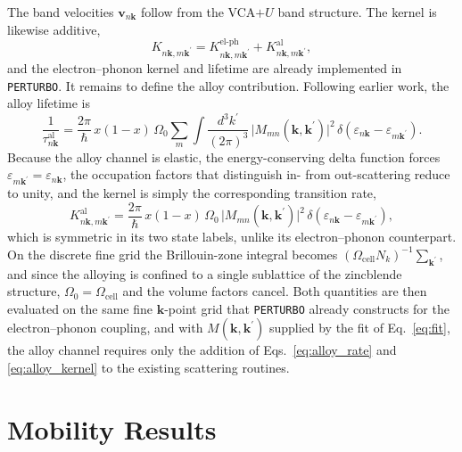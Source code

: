 \documentclass[aps,prmaterials,reprint,amsmath,amssymb,superscriptaddress]{revtex4-2}
\begin{document}
The band velocities $\bm{v}_{n\bm{k}}$ follow from the VCA$+U$ band structure. The kernel is likewise additive,
\begin{equation}
    K_{n\bm{k},m\bm{k}^\prime} = K^\text{el-ph}_{n\bm{k},m\bm{k}^\prime}
    + K^\text{al}_{n\bm{k},m\bm{k}^\prime},
    \label{eq:kernel_sum}
\end{equation}
and the electron--phonon kernel and lifetime are already implemented in \texttt{PERTURBO}\cite{Perturbo1}. It remains to define the alloy contribution. Following earlier work\cite{Chin1991,MurphyArmando2006,MurphyArmando2008}, the alloy lifetime is
\begin{equation}
    \frac{1}{\tau^\text{al}_{n\bm{k}}}
    = \frac{2\pi}{\hbar}\, x(1-x)\,\Omega_0 \sum_{m}\int \frac{d^{3}k^\prime}{(2\pi)^{3}}\,
    \big|M_{mn}(\bm{k},\bm{k}^\prime)\big|^{2}\,
    \delta(\varepsilon_{n\bm{k}}-\varepsilon_{m\bm{k}^\prime}).
    \label{eq:alloy_rate}
\end{equation}
Because the alloy channel is elastic, the energy-conserving delta function forces $\varepsilon_{m\bm{k}^\prime}=\varepsilon_{n\bm{k}}$, the occupation factors that distinguish in- from out-scattering reduce to unity, and the kernel is simply the corresponding transition rate,
\begin{equation}
    K^\text{al}_{n\bm{k},m\bm{k}^\prime}=\frac{2\pi}{\hbar}\,x(1-x)\,\Omega_0\,
    \big|M_{mn}(\bm{k},\bm{k}^\prime)\big|^{2}\,
    \delta(\varepsilon_{n\bm{k}}-\varepsilon_{m\bm{k}^\prime}),
    \label{eq:alloy_kernel}
\end{equation}
which is symmetric in its two state labels, unlike its electron--phonon counterpart. On the discrete fine grid the Brillouin-zone integral becomes $(\Omega_\text{cell}N_k)^{-1}\sum_{\bm{k}^\prime}$, and since the alloying is confined to a single sublattice of the zincblende structure, $\Omega_0=\Omega_\text{cell}$ and the volume factors cancel. Both quantities are then evaluated on the same fine $\bm{k}$-point grid that \texttt{PERTURBO} already constructs for the electron--phonon coupling, and with $M(\bm{k},\bm{k}^\prime)$ supplied by the fit of Eq.~\eqref{eq:fit}, the alloy channel requires only the addition of Eqs.~\eqref{eq:alloy_rate} and \eqref{eq:alloy_kernel} to the existing scattering routines.

\section{Mobility Results}\label{sec:results}
\end{document}
